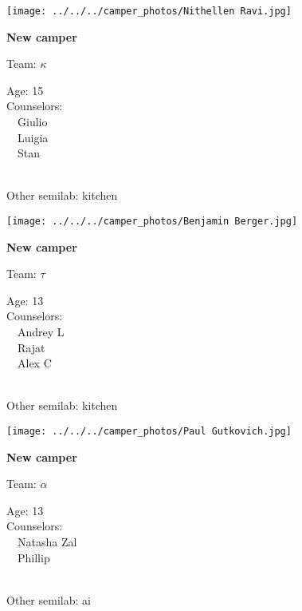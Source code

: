\documentclass[10pt,letterpaper, landscape]{article}
\begin{document}
\verticalshiftfornextsticker
\renewcommand{\baselinestretch}{1} \begin{sticker}
\noindent\begin{minipage}{0.5\textwidth}\texttt{[image: ../../../camper\_photos/Nithellen Ravi.jpg]}\end{minipage}\begin{minipage}{0.45\textwidth}
\textbf{New camper} 

Team: {\Large $\kappa$}

Age:        15\\
Counselors: \\\ \ Giulio\\\ \ Luigia\\\ \ Stan\\
\end{minipage} \\ \vspace{0.07in}
Other semilab: kitchen
\end{sticker}
\horizontalshiftfornextsticker
\renewcommand{\baselinestretch}{1} \begin{sticker}
\noindent\begin{minipage}{0.5\textwidth}\texttt{[image: ../../../camper\_photos/Benjamin Berger.jpg]}\end{minipage}\begin{minipage}{0.45\textwidth}
\textbf{New camper} 

Team: {\Large $\tau$}

Age:        13\\
Counselors: \\\ \ Andrey L\\\ \ Rajat\\\ \ Alex C\\
\end{minipage} \\ \vspace{0.07in}
Other semilab: kitchen
\end{sticker}
\horizontalshiftfornextsticker
\renewcommand{\baselinestretch}{1} \begin{sticker}
\noindent\begin{minipage}{0.5\textwidth}\texttt{[image: ../../../camper\_photos/Paul Gutkovich.jpg]}\end{minipage}\begin{minipage}{0.45\textwidth}
\textbf{New camper} 

Team: {\Large $\alpha$}

Age:        13\\
Counselors: \\\ \ Natasha Zal\\\ \ Phillip\\
\end{minipage} \\ \vspace{0.07in}
Other semilab: ai
\end{sticker}
\end{document}
